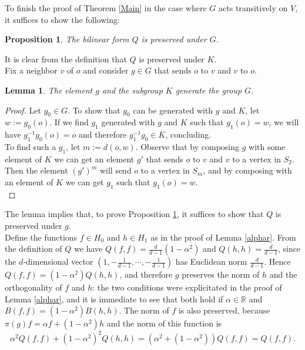 \documentclass{article}
\theoremstyle{definition}
\theoremstyle{remark}
\theoremstyle{plain}
\newtheorem{prp}[dfn]{Proposition}
\newtheorem{lem}[dfn]{Lemma}
\begin{document}
To finish the proof of Theorem \ref{Main} in the case where $G$ acts transitively on $V$, it suffices to show the following:

\begin{prp} \label{qpres}
The bilinear form $Q$ is preserved under $G$. \\
\end{prp}

It is clear from the definition that $Q$ is preserved under $K$. \\

Fix a neighbor $v$ of $o$ and consider $g\in G$ that sends $o$ to $v$ and $v$ to $o$. \\

\begin{lem} \label{gkgen}
The element $g$ and the subgroup $K$ generate the group $G$.
\end{lem}

\begin{proof}
Let $g_0\in G$. To show that $g_0$ can be generated with $g$ and $K$, let $w:=g_0(o)$. If we find $g_1$ generated with $g$ and $K$ such that $g_1(o)=w$, we will have $g_1^{-1}g_0(o)=o$ and therefore $g_1^{-1}g_0\in K$, concluding. \\

To find such a $g_1$, let $m:=d(o,w)$. Observe that by composing $g$ with some element of $K$ we can get an element $g'$ that sends $o$ to $v$ and $v$ to a vertex in $S_2$. Then the element $(g')^m$ will send $o$ to a vertex in $S_m$, and by composing with an element of $K$ we can get $g_1$ such that $g_1(o)=w$. \\
\end{proof}

The lemma implies that, to prove Proposition \ref{qpres}, it suffices to show that $Q$ is preserved under $g$. \\

Define the functions $f\in H_0$ and $h\in H_1$ as in the proof of Lemma \ref{alphar}. From the definition of $Q$ we have $Q(f,f)=\frac{d}{d-1}(1-\alpha^2)$ and $Q(h,h)=\frac{d}{d-1}$, since the $d$-dimensional vector $(1,-\frac{1}{d-1},\cdots,-\frac{1}{d-1})$ has Euclidean norm $\frac{d}{d-1}$. Hence $Q(f,f)=(1-\alpha^2)Q(h,h)$, and therefore $g$ preserves the norm of $h$ and the orthogonality of $f$ and $h$: the two conditions were explicitated in the proof of Lemma \ref{alphar}, and it is immediate to see that both hold if $\alpha\in\mathbb{R}$ and $B(f,f)=(1-\alpha^2)B(h,h)$. The norm of $f$ is also preserved, because $\pi(g)f=\alpha f+(1-\alpha^2)h$ and the norm of this function is $$\alpha^2 Q(f,f)+(1-\alpha^2)^2 Q(h,h)=(\alpha^2+(1-\alpha^2))Q(f,f)=Q(f,f).$$
\end{document}
